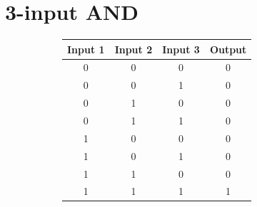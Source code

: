 \section{3-input AND}

\begin{figure}[H]
  \begin{subfigure}[t]{.49\columnwidth}
    \begin{adjustbox}{width=\textwidth}
    \begin{tabular}[b]{cccc}
      \hline
    \multicolumn{1}{l}{\textbf{Input 1}} & \multicolumn{1}{l}{\textbf{Input 2}} & \multicolumn{1}{l}{\textbf{Input 3}} & \multicolumn{1}{l}{\textbf{Output}} \\
    \hline
    0 & 0                                    & 0                                    & 0                                   \\
    0 & 0                                    & 1                                    & 0                                   \\
    0 & 1                                    & 0                                    & 0                                   \\
    0 & 1                                    & 1                                    & 0                                   \\
    1 & 0                                    & 0                                    & 0                                   \\
    1 & 0                                    & 1                                    & 0                                   \\
    1 & 1                                    & 0                                    & 0                                   \\
    1 & 1                                    & 1                                    & 1                                   \\


\end{tabular}
\end{adjustbox}
\end{subfigure}
\end{figure}
